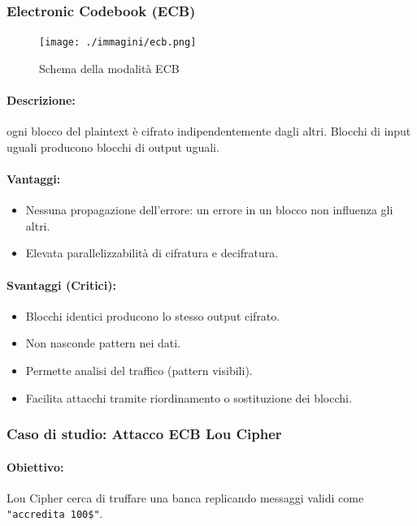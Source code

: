 \documentclass{report}
\begin{document}
\subsubsection{Electronic Codebook (ECB)}

\begin{figure}[h]
    \centering
    \texttt{[image: ./immagini/ecb.png]} %
    \caption{Schema della modalità ECB}
    \label{fig:ecb-mode}
\end{figure}

\paragraph{Descrizione:} ogni blocco del plaintext è cifrato indipendentemente dagli altri. Blocchi di input uguali producono blocchi di output uguali.

\paragraph{Vantaggi:} 
\begin{itemize}
    \item Nessuna propagazione dell'errore: un errore in un blocco non influenza gli altri.
    \item Elevata parallelizzabilità di cifratura e decifratura.
\end{itemize}

\paragraph{Svantaggi (Critici):}
\begin{itemize}
    \item Blocchi identici producono lo stesso output cifrato.
    \item Non nasconde pattern nei dati.
    \item Permette analisi del traffico (pattern visibili).
    \item Facilita attacchi tramite riordinamento o sostituzione dei blocchi.
\end{itemize}

\subsubsection{Caso di studio: Attacco ECB  Lou Cipher}

\paragraph{Obiettivo:} Lou Cipher cerca di truffare una banca replicando messaggi validi come \texttt{"accredita 100\$"}.
\end{document}

